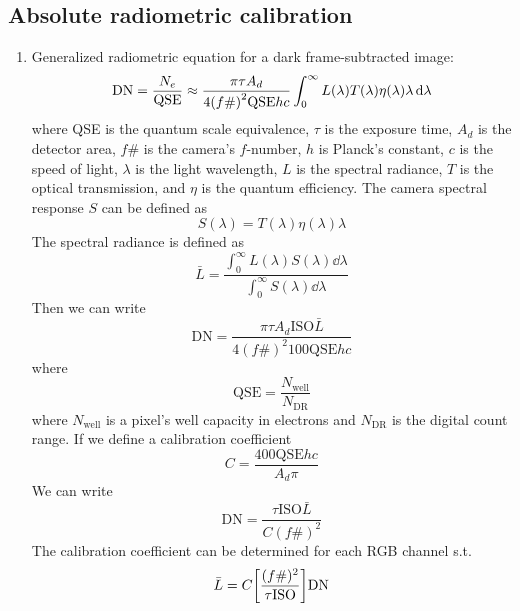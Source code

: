 \documentclass[12pt,a4paper]{article}
\begin{document}
\subsection{Absolute radiometric calibration}
\begin{enumerate}
	\item Generalized radiometric equation for a dark frame-subtracted image:
		\begin{equation}
			\mathrm{DN} = \frac{N_e}{\mathrm{QSE}} \approx \frac{\pi\tau A_d}{4\qty(f\#)^2 \mathrm{QSE}hc} \int_0^\infty L(\lambda) T(\lambda) \eta(\lambda) \lambda \dd{\lambda}
		\end{equation}
		where QSE is the quantum scale equivalence, $\tau$ is the exposure time, $A_d$ is the detector area, $f\#$ is the camera's $f$-number, $h$ is Planck's constant, $c$ is the speed of light, $\lambda$ is the light wavelength, $L$ is the spectral radiance, $T$ is the optical transmission, and $\eta$ is the quantum efficiency. The camera spectral response $S$ can be defined as
		\begin{equation}
			S(\lambda) = T(\lambda)\eta(\lambda)\lambda
		\end{equation}
		The spectral radiance is defined as
		\begin{equation}
			\bar{L} = \frac{\int_0^\infty L(\lambda)S(\lambda)\dd{\lambda}}{\int_0^\infty S(\lambda)\dd{\lambda}}
		\end{equation}
		Then we can write
		\begin{equation}
			\mathrm{DN} = \frac{\pi\tau A_d \mathrm{ISO} \bar{L}}{4(f\#)^2 100 \mathrm{QSE} hc}
		\end{equation}
		where
		\begin{equation}
			\mathrm{QSE} = \frac{N_{\mathrm{well}}}{N_{\mathrm{DR}}}
		\end{equation}
		where $N_{\mathrm{well}}$ is a pixel's well capacity in electrons and $N_{\mathrm{DR}}$ is the digital count range.
		If we define a calibration coefficient
		\begin{equation}
			C = \frac{400\mathrm{QSE}hc}{A_d \pi}
		\end{equation}
		We can write
		\begin{equation}
			\mathrm{DN} = \frac{\tau\mathrm{ISO}\bar{L}}{C(f\#)^2}
		\end{equation}
		The calibration coefficient can be determined for each RGB channel s.t.
		\begin{equation}
			\bar{L} = C\qty[\frac{(f\#)^2}{\tau\mathrm{ISO}}]\mathrm{DN}
		\end{equation}
\end{enumerate}




\end{document}
